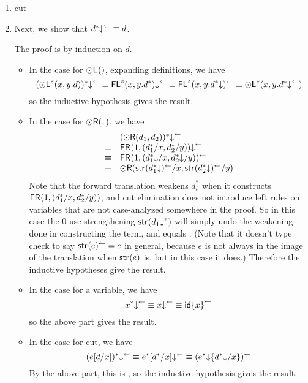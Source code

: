 \begin{enumerate}
\begin{itemize}
\end{itemize}

\item cut

\item Next, we show that ${d^*\mathord{\downarrow}}^{\leftarrow} \equiv d$.  

The proof is by induction on $d$.  

\begin{itemize}
\item In the case for $\mathord{\odot}\mathsf{L}^{}()$, expanding definitions, we have
\[
(\mathord{\odot}\mathsf{L}^{z}(x,y.d))^*\mathord{\downarrow}^{\leftarrow} \equiv
\mathsf{FL}^{z}(x,y.d^*)\mathord{\downarrow}^{\leftarrow} \equiv 
\mathsf{FL}^{z}(x,y.d^*\mathord{\downarrow})^{\leftarrow} \equiv
{\ensuremath{\mathord{\odot}}\ensuremath{\mathsf{L}}^{z}(x,y.\ensuremath{d^*\mathord{\downarrow}^{\leftarrow}})}
\]
so the inductive hypothesis gives the result.  

\item In the case for $\mathord{\odot}\mathsf{R}(,)$, we have
\[
\begin{array}{ll}
& (\mathord{\odot}\mathsf{R}(d_1,d_2))^*\mathord{\downarrow}^{\leftarrow} \\
\equiv & \mathsf{FR}_{}(1,(d_1^*/x,d_2^*/y))\mathord{\downarrow}^{\leftarrow} \\
\equiv & \mathsf{FR}_{}(1,(d_1^*\mathord{\downarrow}/x,d_2^*\mathord{\downarrow}/y))^{\leftarrow} \\
\equiv & \mathord{\odot}\mathsf{R}(\mathsf{str}_{}(d_1^*\mathord{\downarrow})^{\leftarrow}/x,\mathsf{str}_{}(d_2^*\mathord{\downarrow})^{\leftarrow}/y)
\end{array}
\]
Note that the forward translation weakens $d_i^*$ when it constructs 
${\mathsf{FR}_{}(1,(d_1^*/x,d_2^*/y))}$, and cut elimination does not introduce
left rules on variables that are not case-analyzed somewhere in the
proof.  
So in this case the 0-use strengthening $\mathsf{str}_{}(d_1\mathord{\downarrow}^*)$ will
simply undo the weakening done in constructing the term, and
 equals .  (Note
that it doesn't type check to say $\mathsf{str}_{}(e)^{\leftarrow} = e$ in general,
because $e$ is not always in the image of the translation when
$\mathsf{str}_{}(e)$ is, but in this case it does.)  Therefore the inductive
hypotheses give the result.  

\item In the case for a variable, we have
\[
x^*\mathord{\downarrow}^{\leftarrow} \equiv x\mathord{\downarrow}^{\leftarrow} \equiv {\ensuremath{\mathsf{id}}\{x\}}^{\leftarrow}
\]
so the above part gives the result.  

\item In the case for cut, we have
\[
(e[d/x])^*\mathord{\downarrow}^{\leftarrow} \equiv e^*[d^*/x]\mathord{\downarrow}^{\leftarrow}
\equiv (e^*\mathord{\downarrow}\{d^*\mathord{\downarrow}/x\})^{\leftarrow}
\]
By the above part, this is 
, 
so the inductive hypothesis gives the result.  


\end{itemize}
\end{enumerate}
